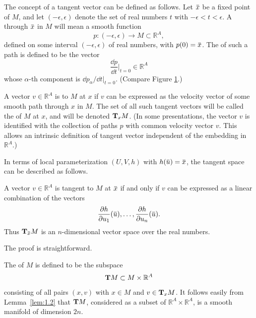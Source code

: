 \documentclass[../main]{subfiles}
\begin{document}
The concept of a tangent vector can be defined as follows. Let $\xoverline x$ be a fixed point of $M$, and let $(-\epsilon, \epsilon)$ denote the set of real numbers $t$ with $-\epsilon < t < \epsilon$. A  through $\xoverline x$ in $M$ will mean a smooth function \[p : (-\epsilon, \epsilon) \longrightarrow M \subset {\mathbb R}^A,\] defined on some interval $(-\epsilon, \epsilon)$ of real numbers, with $p(0) = \xoverline x$. The  of such a path is defined to be the vector 
\[\dfrac{\dd p}{\dd t} \Big|_{t = 0} \in {\mathbb R}^A\] whose $\alpha$-th component is $\dd p_\alpha/\dd t\big|_{t=0}$. (Compare Figure \ref{fig:figure1}.) 

\begin{definition}
A vector $v \in {\mathbb R}^A$ is  to $M$ at $x$ if $v$ can be expressed as the velocity vector of some smooth path through $x$ in $M$. The set of all such tangent vectors will be called the  of $M$ at $x$, and will be denoted $\tangentspace M x$. (In some presentations, the vector $v$ is identified with the collection of paths $p$ with common velocity vector $v$. This allows an intrinsic definition of tangent vector independent of the embedding in ${\mathbb R}^A$.)
\end{definition}




In terms of local parameterization $(U, V, h)$ with $h(\xoverline u) = \xoverline x$, the tangent space can be described as follows.
\begin{lemma}
\label{lem:1.2}
A vector $v \in {\mathbb R}^A$ is tangent to $M$ at $\xoverline x$ if and only if $v$ can be expressed as a linear combination of the vectors \[\frac {\partial h} {\partial u_1}(\xoverline u), \ldots, \frac {\partial h} {\partial u_n} (\xoverline u).\] Thus $\tangentspace M {\xoverline x}$ is an $n$-dimensional vector space over the real numbers. 
\end{lemma}

The proof is straightforward. 

\begin{figure}[ht]
    \centering
    \caption{}
    \label{fig:figure1}
\end{figure}
The  of $M$ is defined to be the subspace \[\tangentTS M \subset M \times {\mathbb R}^A\] consisting of all pairs $(x, v)$ with $x \in M$ and $v \in \tangentspace M x$. It follows easily from Lemma~\ref{lem:1.2} that $\tangentTS M$, considered as a subset of ${\mathbb R}^A \times {\mathbb R}^A$, is a smooth manifold of dimension $2 n$. 
\end{document}
